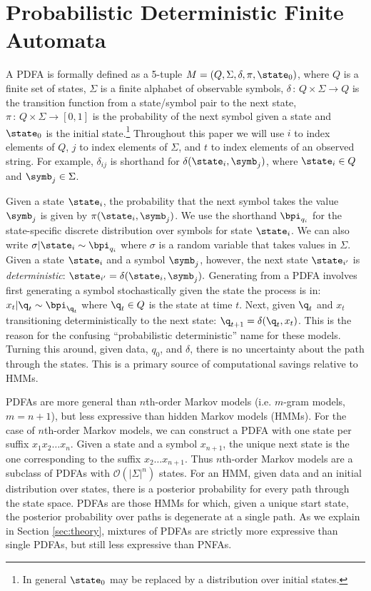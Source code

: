 \section{Probabilistic Deterministic Finite Automata}
\label{sec:PDFA}

A PDFA is formally defined as a 5-tuple $M = (Q,\Sigma,\delta,\pi,\state_0)$, where $Q$ is a finite set of states, $\Sigma$ is a finite alphabet of observable symbols, $\delta\,:\,Q\times\Sigma\rightarrow Q$ is the transition function from a state/symbol pair to the next state, $\pi\,:\,Q\times\Sigma\rightarrow[0,1]$ is the probability of the next symbol given a state and $\state_0$ is the initial state.\footnote{In general $\state_0$ may be replaced by a distribution over initial states.  }  Throughout this paper we will use $i$ to index elements of $Q$, $j$ to index elements of $\Sigma$, and $t$ to index elements of an observed string.  For example, $\delta_{ij}$ is shorthand for $\delta(\state_i,\symb_j)$, where $\state_i \in Q$ and $\symb_j \in \Sigma$.

Given a state $\state_i$, the probability that the next symbol takes the value $\symb_j$ is given by $\pi(\state_i,\symb_j)$.  We use the shorthand $\bpi_{q_i}$ for the state-specific discrete distribution over symbols for state $\state_i$.  We can also write $\sigma|\state_i \sim \bpi_{q_i}$ where $\sigma$ is a random variable that takes values in $\Sigma$.  Given a state $\state_i$ and a symbol $\symb_j$, however, the next state $\state_{i'}$ is {\it deterministic}: $\state_{i'} = \delta(\state_i,\symb_j).$   Generating from a PDFA involves first generating a symbol stochastically given the state the process is in: $x_t|\q_t \sim \bpi_{\q_t}$ where $\q_t \in Q$ is the state at time $t$.  Next, given $\q_t$ and $x_t$ transitioning deterministically to the next state: $\q_{t+1} = \delta(\q_t,x_t)$.  This is the reason for the confusing ``probabilistic deterministic'' name for these models.  Turning this around, given data, $q_0$, and $\delta$, there is no uncertainty about the path through the states.  This is a primary source of computational savings relative to HMMs.

PDFAs are more general than $n$th-order Markov models (i.e. $m$-gram models, $m=n+1$), but less expressive than hidden Markov models (HMMs)\cite{Dupont2005}.  For the case of $n$th-order Markov models, we can construct a PDFA with one state per suffix $x_1 x_2 \ldots x_n$.  Given a state and a symbol $x_{n+1}$, the unique next state is the one corresponding to the suffix $x_2 \ldots x_{n+1}$.  Thus $n$th-order Markov models are a subclass of PDFAs with $\mathcal{O}(|\Sigma|^n)$ states.  For an HMM, given data and an initial distribution over states, there is a posterior probability for every path through the state space.  PDFAs are those HMMs for which, given a unique start state, the posterior probability over paths is degenerate at a single path.  As we explain in Section \ref{sec:theory}, mixtures of PDFAs are strictly more expressive than single PDFAs, but still less expressive than PNFAs.